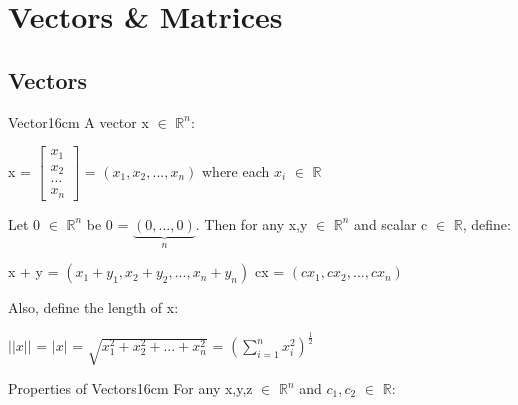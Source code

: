 \newpage

\section[Day 1: Vectors \& Matrices]{ Vectors \& Matrices }

\subsection{ Vectors }

    \begin{definition}{Vector}{16cm}
        A {\color{lblue} vector} x $\in$ $\mathbb{R}^n$:

        \hspace{0.5cm}
        x =
        $\begin{bmatrix}
            x_1 \\
            x_2 \\
            \hdots \\
            x_n
        \end{bmatrix}$
        = $(x_1,x_2,...,x_n)$
        \hspace{0.5cm}
        where each $x_i$ $\in$ $\mathbb{R}$

        Let 0 $\in$ $\mathbb{R}^n$ be 0 = $\underbrace{(0,...,0)}_n$.
        Then for any x,y $\in$ $\mathbb{R}^n$ and scalar c $\in$ $\mathbb{R}$,
        define:

        \hspace{0.5cm}
        x + y = $(x_1 + y_1 , x_2 + y_2 , ... , x_n + y_n)$
        \hspace{1cm}
        cx = $(cx_1 , cx_2 , ... , cx_n)$

        Also, define the {\color{lblue} length} of x:

        \hspace{0.5cm}
        $||x||$ = $|x|$ = $\sqrt{x_1^2 + x_2^2 + ... + x_n^2}$
        = $(\sum_{i=1}^n x_i^2)^{\frac{1}{2}}$
    \end{definition}

    \vspace{0.5cm}



    \begin{wtheorem}{Properties of Vectors}{16cm}
        For any x,y,z $\in$ $\mathbb{R}^n$ and $c_1,c_2$ $\in$ $\mathbb{R}$:
    \end{wtheorem}

